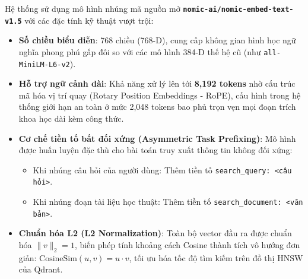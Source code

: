 Hệ thống sử dụng mô hình nhúng mã nguồn mở \textbf{\texttt{nomic-ai/nomic-embed-text-v1.5}} với các đặc tính kỹ thuật vượt trội:
\begin{itemize}
  \item \textbf{Số chiều biểu diễn}: 768 chiều (768-D), cung cấp không gian hình học ngữ nghĩa phong phú gấp đôi so với các mô hình 384-D thế hệ cũ (như \texttt{all-MiniLM-L6-v2}).
  \item \textbf{Hỗ trợ ngữ cảnh dài}: Khả năng xử lý lên tới \textbf{8,192 tokens} nhờ cấu trúc mã hóa vị trí quay (Rotary Position Embeddings - RoPE), cấu hình trong hệ thống giới hạn an toàn ở mức 2,048 tokens bao phủ trọn vẹn mọi đoạn trích khoa học dài kèm công thức.
  \item \textbf{Cơ chế tiền tố bất đối xứng (Asymmetric Task Prefixing)}: Mô hình được huấn luyện đặc thù cho bài toán truy xuất thông tin không đối xứng:
    \begin{itemize}
      \item Khi nhúng câu hỏi của người dùng: Thêm tiền tố \texttt{search\_query: <câu hỏi>}.
      \item Khi nhúng đoạn tài liệu học thuật: Thêm tiền tố \texttt{search\_document: <văn bản>}.
    \end{itemize}
  \item \textbf{Chuẩn hóa L2 (L2 Normalization)}: Toàn bộ vector đầu ra được chuẩn hóa $\|v\|_2 = 1$, biến phép tính khoảng cách Cosine thành tích vô hướng đơn giản: $\text{CosineSim}(u, v) = u \cdot v$, tối ưu hóa tốc độ tìm kiếm trên đồ thị HNSW của Qdrant.
\end{itemize}
